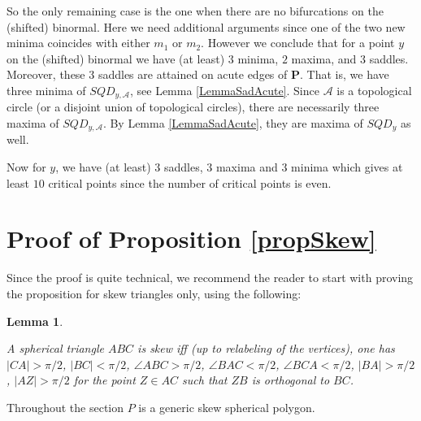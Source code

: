\documentclass[12pt]{amsart}
\newtheorem{lemma}{Lemma}
\newtheorem*{main lemma}{The main lemma}
\begin{document}
  So the only remaining case is the one when there are no bifurcations on the (shifted) binormal.
 Here we need additional arguments since one of the two new minima coincides
with either $m_1$ or $m_2$. However we conclude that for a point $y$ on the (shifted) binormal we have (at least) $3$ minima, $2$ maxima, and $3$ saddles.
Moreover, these  $3$ saddles are attained on acute edges of $\mathbf{P}$. That is, we have three minima of $SQD_{y,\mathcal{A}}$, see Lemma \ref{LemmaSadAcute}.  Since $\mathcal{A}$  is a topological circle (or a disjoint union of topological circles),  there are necessarily three maxima of $SQD_{y,\mathcal{A}}$.  By Lemma \ref{LemmaSadAcute}, they are maxima of $SQD_y$ as well.

Now for $y$, we have (at least) $3$ saddles, $3$ maxima  and $3$ minima which gives at least $10$ critical points since the number of critical points is even.

\section{Proof of Proposition \ref{propSkew}}\label{SecProofProp2}

Since the proof is quite technical, we recommend the reader to start with proving the proposition for skew triangles only,   using  the following:

\begin{lemma}\cite{NasPanSiersma}\label{lemSkewTria}

A spherical triangle $ABC$ is skew iff (up to relabeling of the vertices), one has  $|CA|> \pi/2$, 
                                                                                                 $|BC|< \pi/2$,
                                                                                        $\angle ABC> \pi/2$,      
                                                                                                  $\angle BAC <\pi/2$,
                                                                                                 $ \angle BCA < \pi/2$,
                                                                                                  $|BA|> \pi/2$,
$|AZ| > \pi/2$ for the point $Z\in AC$ such that $ZB$ is orthogonal to $BC$.
\end{lemma}

\medskip


Throughout the section $P$ is a generic skew spherical polygon.
\end{document}
